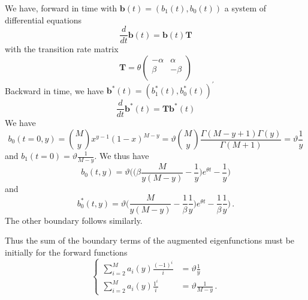 \documentclass[preprint]{elsarticle}
\begin{document}
We have, forward in time with $\mathbf{b}(t)=(b_1(t),b_0(t))$ a system of differential equations 
\begin{equation}\label{eq:forw_de_b}
    \frac{d}{dt} \mathbf{b}(t)=\mathbf{b}(t)\mathbf{T}
\end{equation}
with the transition rate matrix 
\begin{equation}\label{eq:forward_T_bound}
    \mathbf{T}=\theta
    \begin{pmatrix}
    -\alpha &\alpha\\
    \beta &-\beta\\
    \end{pmatrix}
\end{equation}
Backward in time, we have $\mathbf{b}^{*}(t)=(b_1^{*}(t),b_0^{*}(t))^{'}$
\begin{equation}\label{eq:forw_de_b}
    \frac{d}{dt} \mathbf{b}^{*}(t)=\mathbf{T}\mathbf{b}^{*}(t)
\end{equation}
We have 
\begin{equation}
    b_0(t=0,y)=\binom{M}{y}x^{y-1}(1-x)^{M-y}
    =\vartheta\binom{M}{y}\frac{\Gamma(M-y+1)\Gamma(y)}{\Gamma(M+1)}=\vartheta\frac1{y}
\end{equation}
and $b_1(t=0)=\vartheta\frac1{M-y}$.
We thus have 
\begin{equation}
    b_0(t,y)=\vartheta\bigg(\bigg(\beta\frac{M}{y(M-y)}-\frac1{y}\bigg)e^{\theta t}-\frac1{y}\bigg)
\end{equation}
and
\begin{equation}
    b_0^{*}(t,y)=\vartheta\bigg(\frac{M}{y(M-y)}-\frac{1}{\beta}\frac1{y}\bigg)e^{\theta t}-\frac{1}{\beta}\frac1{y}\bigg)\,.
\end{equation}
The other boundary follows similarly. 

Thus the sum of the boundary terms of the augmented eigenfunctions must be initially for the forward functions
\begin{equation}
\begin{cases}
    \sum_{i=2}^M a_i(y)\frac{(-1)^i}{i}&=\vartheta\frac1{y}\\
    \sum_{i=2}^M a_i(y)\frac{1^i}{i}&=\vartheta\frac1{M-y}\,.
\end{cases}
\end{equation}
\end{document}
